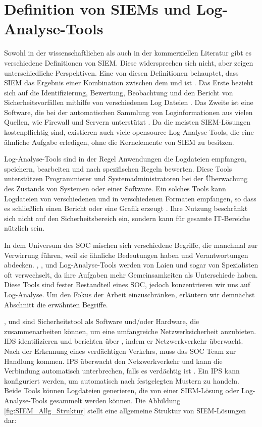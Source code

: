 \section{Definition von SIEMs und Log-Analyse-Tools}

Sowohl in der wissenschaftlichen als auch in der kommerziellen Literatur gibt es verschiedene Definitionen von \gls{SIEM}. Diese widersprechen sich nicht, aber zeigen unterschiedliche Perspektiven. Eine von diesen Definitionen behauptet, dass \gls{SIEM} das Ergebnis einer Kombination zwischen dem  und  ist \citep{Dorigo_SIEM}. Das Erste bezieht sich auf die Identifizierung, Bewertung, Beobachtung und den Bericht von Sicherheitsvorfällen mithilfe von verschiedenen Log Dateien \citep{techopedia_SEM}. Das Zweite ist eine Software, die bei der automatischen Sammlung von Loginformationen aus vielen Quellen, wie Firewall und Servern unterstützt \citep{techopedia_SIM}. Da die meisten \gls{SIEM}-Lösungen kostenpflichtig sind, existieren auch viele \gls{opensource} Log-Analyse-Tools, die eine ähnliche Aufgabe erledigen, ohne die Kernelemente von \gls{SIEM} zu besitzen.

Log-Analyse-Tools sind in der Regel Anwendungen die Logdateien empfangen, speichern, bearbeiten und nach spezifischen Regeln bewerten. Diese Tools unterstützen Programmierer und Systemadministratoren bei der Überwachung des Zustands von Systemen oder einer Software. Ein solches Tools kann Logdateien von verschiedenen  und in verschiedenen Formaten empfangen, so dass es schließlich einen Bericht oder eine Grafik erzeugt \citep{Korzeniowski_LATDef}. Ihre Nutzung beschränkt sich nicht auf den Sicherheitsbereich ein, sondern kann für gesamte IT-Bereiche nützlich sein.

In dem Universum des \gls{SOC} mischen sich verschiedene Begriffe, die manchmal zur Verwirrung führen, weil sie ähnliche Bedeutungen haben und Verantwortungen abdecken. , ,  und Log-Analyse-Tools werden von Laien und sogar von Spezialisten oft verwechselt, da ihre Aufgaben mehr Gemeinsamkeiten als Unterschiede haben. Diese Tools sind fester Bestandteil eines \gls{SOC}, jedoch konzentrieren wir uns auf Log-Analyse. Um den Fokus der Arbeit einzuschränken, erläutern wir demnächst Abschnitt die erwähnten Begriffe.

,  und  sind Sicherheitstool als Software und/oder Hardware, die zusammenarbeiten können, um eine umfangreiche Netzwerksicherheit anzubieten. \gls{IDS} identifizieren und berichten über , indem er Netzwerkverkehr überwacht. Nach der Erkennung eines verdächtigen Verkehrs, muss das \gls{SOC} Team zur Handlung kommen. \gls{IPS} überwacht den Netzwerkverkehr und kann die Verbindung automatisch unterbrechen, falls es verdächtig ist \citep{Wendzel_IS}. Ein \gls{IPS} kann konfiguriert werden, um automatisch nach festgelegten Mustern zu handeln. Beide Tools können Logdateien generieren, die von einer \gls{SIEM}-Lösung oder Log-Analyse-Tools gesammelt werden können. Die Abbildung \ref{fig:SIEM_Allg_Struktur} stellt eine allgemeine Struktur von \gls{SIEM}-Lösungen dar:

